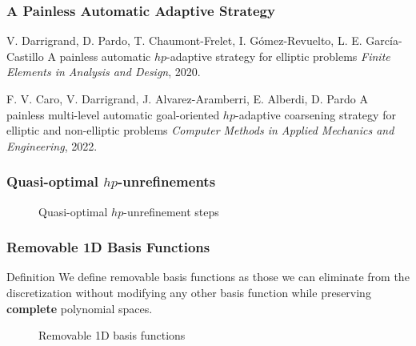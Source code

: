 \begin{frame}
    \frametitle{A Painless Automatic Adaptive Strategy}
    
    \begin{figure}
        \centering
        
    \end{figure}

    \begin{thebibliography}{10}
        \beamertemplatearticlebibitems
        \scriptsize
        V. Darrigrand, D. Pardo, T. Chaumont-Frelet, I. G{\'o}mez-Revuelto, L. E. Garc{\'i}a-Castillo
        \newblock A painless automatic $hp$-adaptive strategy for elliptic problems
        \newblock \emph{Finite Elements in Analysis and Design}, 2020.

        \beamertemplatearticlebibitems
        \scriptsize
        F. V. Caro, V. Darrigrand, J. Alvarez-Aramberri, E. Alberdi, D. Pardo
        \newblock A painless multi-level automatic goal-oriented $hp$-adaptive coarsening strategy for elliptic and non-elliptic problems
        \newblock \emph{Computer Methods in Applied Mechanics and Engineering}, 2022.
    \end{thebibliography}
\end{frame}

\begin{frame}
    \frametitle{Quasi-optimal \( hp \)-unrefinements}
    \vfill
    \begin{center}
        \begin{figure}
            \centering
        		
            \caption{Quasi-optimal \( hp \)-unrefinement steps}
        \end{figure}
    \end{center}    
\end{frame}

\begin{frame}
	\frametitle{Removable 1D Basis Functions}
	\begin{block}{Definition}
	We define {\color{green!50!black} removable} basis functions as those we can eliminate from the discretization without modifying any other basis 	function while preserving \textbf{complete} polynomial spaces. 
	\end{block}
	\begin{figure}
	 \hspace{-1cm}
	\centering
	 
	\caption{Removable 1D basis functions}
	\end{figure}
\end{frame}
